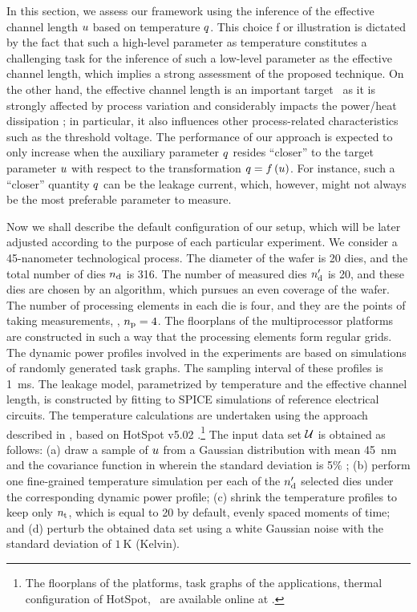 
In this section, we assess our framework using the inference of the effective channel length $u$ based on temperature $q$.
This choice f or illustration is dictated by the fact that such a high-level parameter as temperature constitutes a challenging task for the inference of such a low-level parameter as the effective channel length, which implies a strong assessment of the proposed technique.
On the other hand, the effective channel length is an important target \perse\ as it is strongly affected by process variation and considerably impacts the power/heat dissipation \cite{chandrakasan2001, srivastava2010, juan2012}; in particular, it also influences other process-related characteristics such as the threshold voltage.
The performance of our approach is expected to only increase when the auxiliary parameter $q$ resides ``closer'' to the target parameter $u$ with respect to the transformation $\q = \oBB{\u}$.
For instance, such a ``closer'' quantity $q$ can be the leakage current, which, however, might not always be the most preferable parameter to measure.

Now we shall describe the default configuration of our setup, which will be later adjusted according to the purpose of each particular experiment.
We consider a 45-nanometer technological process.
The diameter of the wafer is 20 dies, and the total number of dies ${n_\text{d}}$ is 316.
The number of measured dies ${n_\text{d}'}$ is 20, and these dies are chosen by an algorithm, which pursues an even coverage of the wafer.
The number of processing elements in each die is four, and they are the points of taking measurements, \ie, ${n_\text{p}} = 4$.
The floorplans of the multiprocessor platforms are constructed in such a way that the processing elements form regular grids.
The dynamic power profiles involved in the experiments are based on simulations of randomly generated task graphs.
The sampling interval of these profiles is 1~ms.
The leakage model, parametrized by temperature and the effective channel length, is constructed by fitting to SPICE simulations of reference electrical circuits.
The temperature calculations are undertaken using the approach described in \cite{ukhov2012}, based on HotSpot v5.02 \cite{hotspot}.\footnote{The floorplans of the platforms, task graphs of the applications, thermal configuration of HotSpot, \etc\ are available online at \cite{sources}.}
The input data set $\mathcal{U}$ is obtained as follows: (a) draw a sample of $u$ from a Gaussian distribution with mean 45~nm and the covariance function in  wherein the standard deviation is 5\% \cite{juan2012}; (b) perform one fine-grained temperature simulation per each of the ${n_\text{d}'}$ selected dies under the corresponding dynamic power profile; (c) shrink the temperature profiles to keep only ${n_\text{t}}$, which is equal to 20 by default, evenly spaced moments of time; and (d) perturb the obtained data set using a white Gaussian noise with the standard deviation of $1~\text{K}$ (Kelvin).

